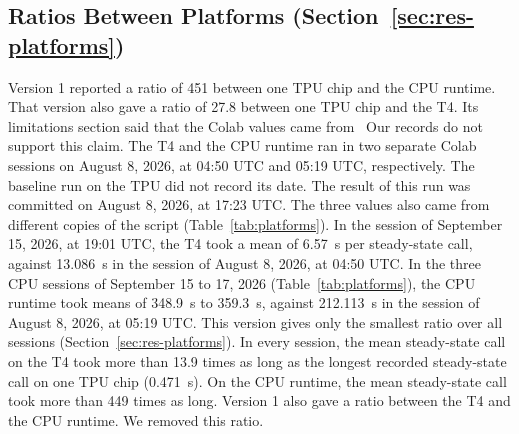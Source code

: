 \subsection*{Ratios Between Platforms (Section~\ref{sec:res-platforms})}
Version 1 reported a ratio of 451 between one TPU chip and the CPU runtime. That version also gave a ratio of 27.8 between one TPU chip and the T4. %
Its limitations section said that the Colab values came from \ Our records do not support this claim.
The T4 and the CPU runtime ran in two separate Colab sessions on August 8, 2026, at 04:50 UTC and 05:19 UTC, respectively. %
The baseline run on the TPU did not record its date. The result of this run was committed on August 8, 2026, at 17:23 UTC. %
The three values also came from different copies of the script (Table~\ref{tab:platforms}).
In the session of September 15, 2026, at 19:01 UTC, the T4 took a mean of 6.57~s per steady-state call, against 13.086~s in the session of August 8, 2026, at 04:50 UTC. %
In the three CPU sessions of September 15 to 17, 2026 (Table~\ref{tab:platforms}), the CPU runtime took means of 348.9~s to 359.3~s, against 212.113~s in the session of August 8, 2026, at 05:19 UTC. %
This version gives only the smallest ratio over all sessions (Section~\ref{sec:res-platforms}).
In every session, the mean steady-state call on the T4 took more than 13.9 times as long as the longest recorded steady-state call on one TPU chip (0.471~s). %
On the CPU runtime, the mean steady-state call took more than 449 times as long. %
Version 1 also gave a ratio between the T4 and the CPU runtime. We removed this ratio.

